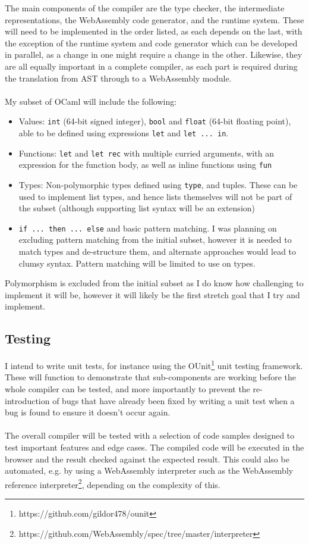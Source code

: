 \documentclass[12pt]{article}
\newcommand{\camlinline}{\texttt}
\begin{document}
	The main components of the compiler are the type checker, the intermediate representations, the WebAssembly code generator, and the runtime system. These will need to be implemented in the order listed, as each depends on the last, with the exception of the runtime system and code generator which can be developed in parallel, as a change in one might require a change in the other. Likewise, they are all equally important in a complete compiler, as each part is required during the translation from AST through to a WebAssembly module.
	\\\\
	My subset of OCaml will include the following:
	\begin{itemize}
		\item Values: \camlinline{int} (64-bit signed integer), \camlinline{bool} and \camlinline{float} (64-bit floating point), able to be defined using expressions \camlinline{let} and \camlinline{let ... in}.
		\item Functions: \camlinline{let} and \camlinline{let rec} with multiple curried arguments, with an expression for the function body, as well as inline functions using \camlinline{fun}
		\item Types: Non-polymorphic types defined using \camlinline{type}, and tuples. These can be used to implement list types, and hence lists themselves will not be part of the subset (although supporting list syntax will be an extension)
		\item \camlinline{if ... then ... else} and basic pattern matching. I was planning on excluding pattern matching from the initial subset, however it is needed to match types and de-structure them, and alternate approaches would lead to clumsy syntax. Pattern matching will be limited to use on types.
	\end{itemize}
	Polymorphism is excluded from the initial subset as I do know how challenging to implement it will be, however it will likely be the first stretch goal that I try and implement.

	\subsection*{Testing}
	I intend to write unit tests, for instance using the OUnit\footnote{https://github.com/gildor478/ounit} unit testing framework. These will function to demonstrate that sub-components are working before the whole compiler can be tested, and more importantly to prevent the re-introduction of bugs that have already been fixed by writing a unit test when a bug is found to ensure it doesn't occur again.
	\\\\
	The overall compiler will be tested with a selection of code samples designed to test important features and edge cases. The compiled code will be executed in the browser and the result checked against the expected result. This could also be automated, e.g. by using a WebAssembly interpreter such as the WebAssembly reference interpreter\footnote{https://github.com/WebAssembly/spec/tree/master/interpreter}, depending on the complexity of this.
	
\end{document}

